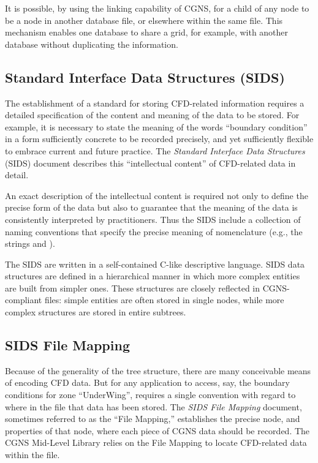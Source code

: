 It is possible, by using the linking capability of CGNS, for a child of
any node to be a node in another database file, or elsewhere within
the same file.
This mechanism enables one database to share a grid, for example, with
another database without duplicating the information.

\subsection{Standard Interface Data Structures (SIDS)}

The establishment of a standard for storing CFD-related information
requires a detailed specification of the content and meaning of the data
to be stored.
For example, it is necessary to state the meaning of the words ``boundary
condition'' in a form sufficiently concrete to be recorded precisely, and
yet sufficiently flexible to embrace current and future practice.
The \textit{Standard Interface Data Structures}
(SIDS) document describes this ``intellectual content'' of CFD-related
data in detail.

An exact description of the intellectual content is required not only
to define the precise form of the data but also to guarantee that the
meaning of the data is consistently interpreted by practitioners.
Thus the SIDS include a collection of naming conventions that
specify the precise meaning of nomenclature (e.g., the strings
 and ).

The SIDS are written in a self-contained C-like descriptive language.
SIDS data structures are defined in a hierarchical manner in which more
complex entities are built from simpler ones.
These structures are closely reflected in CGNS-compliant
files: simple entities are often stored in single nodes, while more
complex structures are stored in entire subtrees.

\subsection{SIDS File Mapping}

Because of the generality of the tree structure, there are
many conceivable means of encoding CFD data.
But for any application to access, say, the boundary conditions for zone
``UnderWing'', requires a single convention with regard to where in the
file that data has been stored.
The \textit{SIDS File Mapping} document, sometimes referred to
as the ``File Mapping,'' establishes the precise node, and properties
of that node, where each piece of CGNS data should be recorded.
The CGNS Mid-Level Library relies on the File Mapping to locate
CFD-related data within the file.

